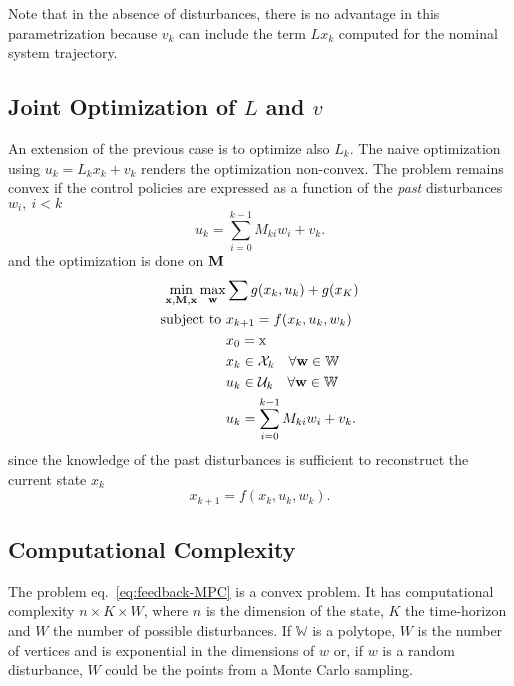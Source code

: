 Note that in the absence of disturbances, there is no advantage in this parametrization because $v_k$ can include the term $Lx_k$ computed for the nominal system trajectory.

\subsection{Joint Optimization of $L$ and $v$}
\label{sec:joint-optimization-L-v}

An extension of the previous case is to optimize also $L_k$. The naive optimization using $u_k=L_k x_k+v_k$ renders the optimization non-convex. The problem remains convex if the control policies are expressed as a function of the \emph{past} disturbances $w_i,\ i<k$
\begin{equation*}
  u_k = \sum_{i=0}^{k-1} M_{ki}w_i + v_k.
\end{equation*}
and the optimization is done on $\boldsymbol{\mathrm{M}}$
\begin{equation*}
  \begin{aligned}
    \min_{\boldsymbol{\mathrm{x}},\boldsymbol{\mathrm{M}},\boldsymbol{\mathrm{x}}} \max_{\boldsymbol{\mathrm{w}}} & \sum g(x_k,u_k) + g(x_K) \\
    \text{subject to } & x_{k+1} = f(x_k,u_k,w_k) \\
                                      & x_0 = \textrm{x} \\
                                      & x_k \in \mathcal{X}_k\quad \forall \boldsymbol{\mathrm{w}} \in \mathbb{W} \\
                                      & u_k \in \mathcal{U}_k\quad \forall \boldsymbol{\mathrm{w}} \in \mathbb{W} \\
                                      & u_k = \sum_{i=0}^{k-1} M_{ki}w_i + v_k.
  \end{aligned}
\end{equation*}
since the knowledge of the past disturbances is sufficient to reconstruct the current state $x_k$
\begin{equation*}
  x_{k+1} = f(x_k,u_k,w_k).
\end{equation*}


\subsection{Computational Complexity}
\label{sec:computational-complexity-rMPC}

The problem eq.~\eqref{eq:feedback-MPC} is a convex problem. It has computational complexity $n\times K\times W$, where $n$ is the dimension of the state, $K$ the time-horizon and $W$ the number of possible disturbances. If $\mathbb{W}$ is a polytope, $W$ is the number of vertices and is exponential in the dimensions of $w$ or, if $w$ is a random disturbance, $W$ could be the points from a Monte Carlo sampling.



